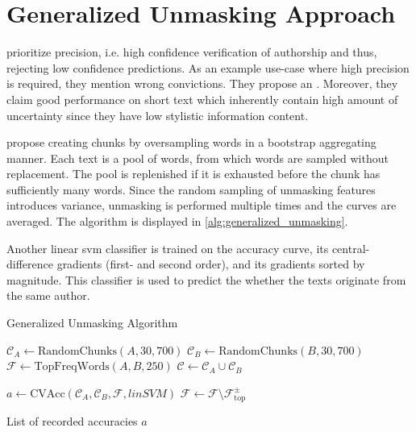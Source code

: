 \section{Generalized Unmasking Approach}
\label{sec:generalized_unmasking_approach}

\citet{bevendorff_generalizing_2019} prioritize precision, 
i.e. high confidence verification of authorship and thus, rejecting low confidence predictions.
As an example use-case where high precision is required, they mention wrong convictions.
They propose an . %
Moreover, they claim good performance on short text which inherently contain high amount of uncertainty since they have low stylistic information content.

\citet{bevendorff_generalizing_2019,bevendorff_divergence_based_2020} propose creating chunks by oversampling words in a bootstrap aggregating manner. 
Each text is a pool of words, from which words are sampled without replacement.
The pool is replenished if it is exhausted before the chunk has sufficiently many words.
Since the random sampling of unmasking features introduces variance, unmasking is performed multiple times and the curves are averaged.
The algorithm is displayed in \autoref{alg:generalized_unmasking}.

Another linear \ac{svm} classifier is trained on the accuracy curve, its central-difference gradients (first- and second order), 
and its gradients sorted by magnitude.
This classifier is used to predict the whether the texts originate from the same author.

\begin{algorithm}
    \caption{Generalized Unmasking Algorithm \cite{bevendorff_generalizing_2019,bevendorff_divergence_based_2020}}
    \label{alg:generalized_unmasking}
    \begin{algorithmic}[1]
    
        \State $\mathcal{C}_A \gets \text{RandomChunks}(A, 30, 700)$ 
        \State $\mathcal{C}_B \gets \text{RandomChunks}(B, 30, 700)$
        \State $\mathcal{F} \gets \text{TopFreqWords}(A, B, 250)$
        \State $\mathcal{C} \gets \mathcal{C}_A \cup \mathcal{C}_B$

        
        \State $a \gets \text{CVAcc}(\mathcal{C}_A, \mathcal{C}_B, \mathcal{F}, linSVM)$ 
        \State $\mathcal{F} \gets \mathcal{F} \setminus \mathcal{F}_{\text{top}}^{\pm}$ 
    
        \EndWhile
    
        \State \Return List of recorded accuracies $a$
    \EndProcedure
    \end{algorithmic}
\end{algorithm}

